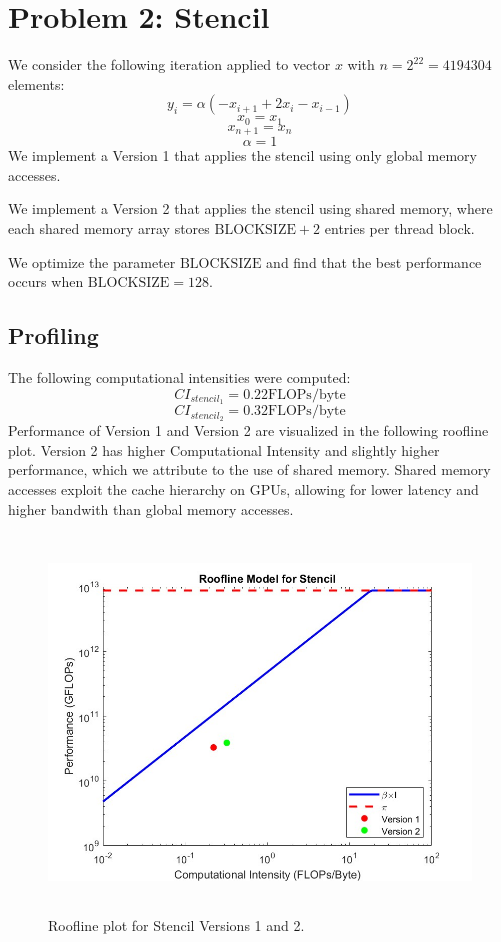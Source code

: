 \documentclass{article}
\begin{document}
\section*{Problem 2: Stencil}
We consider the following iteration applied to vector $x$ with $n = 2^{22}=4194304$ elements:
\[
y_i=\alpha(-x_{i+1}+2x_i-x_{i-1})
\]
\[
x_0=x_1
\]
\[
x_{n+1}=x_n
\]
\[
\alpha = 1
\]
We implement a Version 1 that applies the stencil using only global memory accesses.

We implement a Version 2 that applies the stencil using shared memory, where each shared memory array stores $\text{BLOCKSIZE}+2$ entries per thread block. 

We optimize the parameter $\text{BLOCKSIZE}$ and find that the best performance occurs when $\text{BLOCKSIZE} = 128$.

\subsection*{Profiling}
The following computational intensities were computed:
\[
CI_{stencil_1} = 0.22 \text{FLOPs/byte}
\]
\[
CI_{stencil_2} = 0.32 \text{FLOPs/byte}
\]
Performance of Version 1 and Version 2 are visualized in the following roofline plot. Version 2 has higher Computational Intensity and slightly higher performance, which we attribute to the use of shared memory. Shared memory accesses exploit the cache hierarchy on GPUs, allowing for lower latency and higher bandwith than global memory accesses.
\begin{figure}
    \centering
    \includegraphics[height=10cm]{roofline_stencil.jpg}
    \caption{Roofline plot for Stencil Versions 1 and 2.}
    \label{fig:enter-label}
\end{figure}
\FloatBarrier
\end{document}
